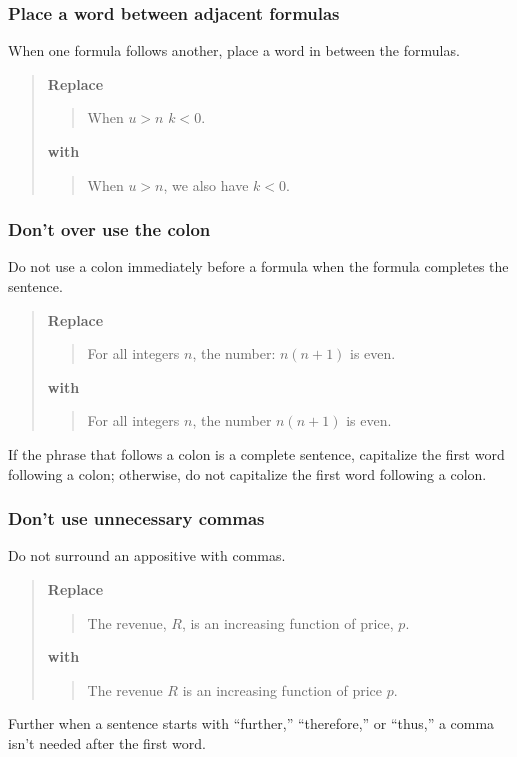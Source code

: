 \documentclass[12pt]{article}
\newcounter{ex}\setcounter{ex}{0}
\newcounter{se}\setcounter{se}{0}
\begin{document}
 \subsubsection{ Place a word between adjacent formulas}

When one formula follows another, place a word in between the formulas.

\begin{quote}
\textbf{\textbf{Replace}}
\begin{quote}
   When \(u > n\)  \(k < 0\).
\end{quote}
\textbf{with}
\begin{quote}
  When \(u > n\), we also have \(k < 0\).
\end{quote}
\end{quote}

 \subsubsection{ Don't over use the colon}

Do not use a colon immediately before a formula when the formula 
completes the sentence.

\begin{quote}
\textbf{\textbf{Replace}}
\begin{quote}
  For all integers \(n\), the number: \(n (n + 1) \) is even.
\end{quote}
\textbf{with}
\begin{quote}
   For all integers \(n\), the number \(n (n + 1) \) is even.
\end{quote}
\end{quote}
If the phrase that follows a colon is a complete sentence, 
capitalize the first word following a colon; otherwise, do
not capitalize the first word following a colon.
 
 \subsubsection{ Don't use unnecessary commas}

Do not surround an appositive with commas.

\begin{quote}
\textbf{\textbf{Replace}}
\begin{quote}
  The revenue, \(R\), is an increasing function of price, \(p\).
\end{quote}
\textbf{with}
\begin{quote}
  The revenue \(R\) is an increasing function of price \(p\).
\end{quote}
\end{quote}
Further when a sentence starts with ``further,'' ``therefore,'' or ``thus,''
a comma isn't needed after the first word.
\end{document}
